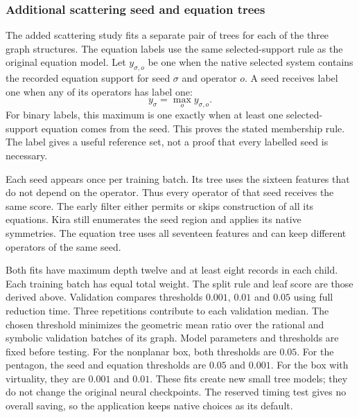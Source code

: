 \subsubsection{Additional scattering seed and equation trees}
The added scattering study fits a separate pair of trees for each of the three graph structures. The equation labels use the same selected-support rule as the original equation model. Let $y_{\sigma,o}$ be one when the native selected system contains the recorded equation support for seed $\sigma$ and operator $o$. A seed receives label one when any of its operators has label one:
\begin{equation}
 y_\sigma=\max_o y_{\sigma,o}.
 \label{history:eq:adapted-seed-label}
\end{equation}
For binary labels, this maximum is one exactly when at least one selected-support equation comes from the seed. This proves the stated membership rule. The label gives a useful reference set, not a proof that every labelled seed is necessary.

Each seed appears once per training batch. Its tree uses the sixteen features that do not depend on the operator. Thus every operator of that seed receives the same score. The early filter either permits or skips construction of all its equations. Kira still enumerates the seed region and applies its native symmetries. The equation tree uses all seventeen features and can keep different operators of the same seed.

Both fits have maximum depth twelve and at least eight records in each child. Each training batch has equal total weight. The split rule and leaf score are those derived above. Validation compares thresholds $0.001$, $0.01$ and $0.05$ using full reduction time. Three repetitions contribute to each validation median. The chosen threshold minimizes the geometric mean ratio over the rational and symbolic validation batches of its graph. Model parameters and thresholds are fixed before testing. For the nonplanar box, both thresholds are $0.05$. For the pentagon, the seed and equation thresholds are $0.05$ and $0.001$. For the box with virtuality, they are $0.001$ and $0.01$. These fits create new small tree models; they do not change the original neural checkpoints. The reserved timing test gives no overall saving, so the application keeps native choices as its default.


